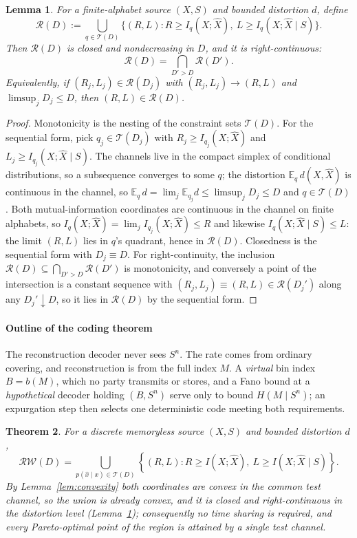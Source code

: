 \documentclass[11pt,onecolumn]{IEEEtran}
\newtheorem{theorem}{Theorem}
\newtheorem{lemma}[theorem]{Lemma}
\newcommand{\E}{\mathbb{E}}
\newcommand{\hX}{\widehat{X}}
\newcommand{\RW}{\mathcal{R}\!\mathcal{W}}
\begin{document}
\begin{lemma}
\label{lem:rightcont}
For a finite-alphabet source $(X,S)$ and bounded distortion $d$, define
\[
\mathcal R(D):=\bigcup_{q\in\mathcal T(D)}
\bigl\{(R,L):R\ge I_q(X;\hX),\ L\ge I_q(X;\hX\mid S)\bigr\}.
\]
Then $\mathcal R(D)$ is closed and nondecreasing in $D$, and it is
right-continuous:
\[
\mathcal R(D)=\bigcap_{D'>D}\mathcal R(D').
\]
Equivalently, if $(R_j,L_j)\in\mathcal R(D_j)$ with
$(R_j,L_j)\to(R,L)$ and $\limsup_jD_j\le D$, then
$(R,L)\in\mathcal R(D)$.
\end{lemma}

\begin{proof}
Monotonicity is the nesting of the constraint sets $\mathcal T(D)$. For
the sequential form, pick $q_j\in\mathcal T(D_j)$ with
$R_j\ge I_{q_j}(X;\hX)$ and $L_j\ge I_{q_j}(X;\hX\mid S)$. The channels
live in the compact simplex of conditional distributions, so a
subsequence converges to some $q$; the distortion $\E_q\,d(X,\hX)$ is
continuous in the channel, so
$\E_q\,d=\lim_j\E_{q_j}d\le\limsup_jD_j\le D$ and $q\in\mathcal T(D)$.
Both mutual-information coordinates are continuous in the channel on
finite alphabets, so $I_q(X;\hX)=\lim_jI_{q_j}(X;\hX)\le R$ and
likewise $I_q(X;\hX\mid S)\le L$: the limit $(R,L)$ lies in $q$'s
quadrant, hence in $\mathcal R(D)$. Closedness is the sequential form
with $D_j\equiv D$. For right-continuity, the inclusion
$\mathcal R(D)\subseteq\bigcap_{D'>D}\mathcal R(D')$ is monotonicity,
and conversely a point of the intersection is a constant sequence with
$(R_j,L_j)\equiv(R,L)\in\mathcal R(D_j')$ along any $D_j'\downarrow D$,
so it lies in $\mathcal R(D)$ by the sequential form.
\end{proof}

\paragraph*{Outline of the coding theorem}
The reconstruction decoder never sees $S^n$. The rate comes from
ordinary covering, and reconstruction is from the full index $M$. A
\emph{virtual} bin index $B=b(M)$, which no party transmits or stores,
and a Fano bound at a \emph{hypothetical} decoder holding $(B,S^n)$
serve only to bound $H(M\mid S^n)$; an expurgation step then selects one
deterministic code meeting both requirements.

\begin{theorem}\label{thm:main-region}
For a discrete memoryless source $(X,S)$ and bounded distortion $d$,
\begin{equation}
\boxed{
 \RW(D)
 =\bigcup_{p(\hat x\mid x)\in\mathcal T(D)}
 \left\{(R,L):
 R\ge I(X;\hX),\
 L\ge I(X;\hX\mid S)
 \right\}.}
 \label{eq:main-region}
\end{equation}
By Lemma~\ref{lem:convexity} both coordinates are convex in the common
test channel, so the union is already convex, and it is closed and
right-continuous in the distortion level (Lemma~\ref{lem:rightcont});
consequently no time sharing is required, and every Pareto-optimal
point of the region is attained by a single test channel.
\end{theorem}
\end{document}
